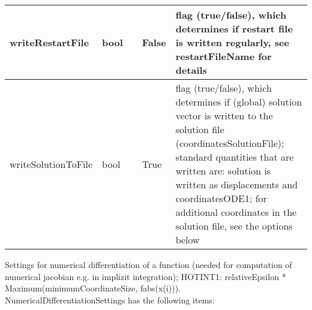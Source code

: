 \begin{center}
\begin{longtable}{| p{4.2cm} | p{2.5cm} | p{0.3cm} | p{3.0cm} | p{6cm} |}
    writeRestartFile &     bool &      &     False &     flag (true/false), which determines if restart file is written regularly, see restartFileName for details\\ \hline
    writeSolutionToFile &     bool &      &     True &     flag (true/false), which determines if (global) solution vector is written to the solution file (coordinatesSolutionFile); standard quantities that are written are: solution is written as displacements and coordinatesODE1; for additional coordinates in the solution file, see the options below\\ \hline
	  \end{longtable}
	\end{center}

 \label{sec:NumericalDifferentiationSettings}
Settings for numerical differentiation of a function (needed for computation of numerical jacobian e.g. in implizit integration); HOTINT1: relativeEpsilon * Maximum(minimumCoordinateSize, fabs(x(i))).\\ 
%
NumericalDifferentiationSettings has the following items:
